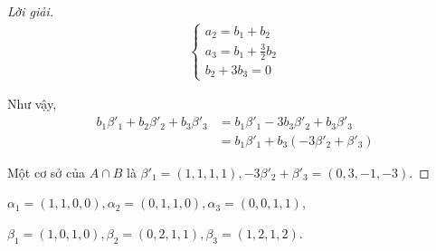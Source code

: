 \documentclass[class=linearalgebra,crop=false]{standalone}
\begin{document}
\begin{proof}[Lời giải]
\begin{align*}
\begin{cases}
                a_{2} = b_{1} + b_{2} \\
                a_{3} = b_{1} + \frac{3}{2}b_{2} \\
                b_{2} + 3b_{3} = 0
            \end{cases}
        \end{align*}
    \par Như vậy,
    \begin{align*}
        b_{1}\beta'_{1} + b_{2}\beta'_{2} + b_{3}\beta'_{3}
        &= b_{1}\beta'_{1} - 3b_{3}\beta'_{2} + b_{3}\beta'_{3} \\
        &= b_{1}\beta'_{1} + b_{3}(-3\beta'_{2} + \beta'_{3})
    \end{align*}
    \par Một cơ sở của $A\cap B$ là $\beta'_{1} = (1,1,1,1), -3\beta'_{2} + \beta'_{3} = (0, 3, -1, -3)$.
\end{proof}

\begin{exercise}$\alpha_{1} = (1,1,0,0), \alpha_{2} = (0,1,1,0), \alpha_{3} = (0,0,1,1)$,
    \par $\beta_{1} = (1,0,1,0), \beta_{2} = (0,2,1,1), \beta_{3} = (1,2,1,2)$.
\end{exercise}
\end{document}
